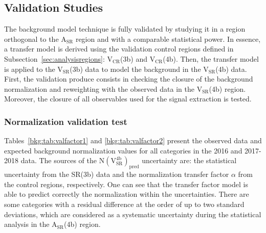 \subsection{Validation Studies} \label{sec:bkgvalidation}
The background model technique is fully validated by studying it in a region orthogonal to the $\mathrm{A_{SR}}$ region and with a comparable statistical power. In essence, a transfer model is derived using the validation control regions defined in Subsection~\ref{sec:analysisregions}: $\mathrm{V_{CR}}$(3b) and $\mathrm{V_{CR}}$(4b). Then, the transfer model is applied to the $\mathrm{V_{SR}}$(3b) data to model the background in the $\mathrm{V_{SR}}$(4b) data. First, the validation produce consists in checking the closure of the background normalization and reweighting with the observed data in the $\mathrm{V_{SR}}$(4b) region. Moreover, the closure of all observables used for the signal extraction is tested.

\subsubsection{Normalization validation test}

Tables~\ref{bkg:tab:valfactor1} and \ref{bkg:tab:valfactor2} present the observed data and expected background normalization values for all categories in the 2016 and 2017-2018 data. The sources of the $\mathrm{N(V_{SR}^{4b})_{pred}}$ uncertainty are: the statistical uncertainty from the SR(3b) data and the normalization transfer factor $\alpha$ from the control regions, respectively. One can see that the transfer factor model is able to predict correctly the normalization within the uncertainties. There are some categories with a residual difference at the order of up to two standard deviations, which are considered as a systematic uncertainty during the statistical analysis in the $\mathrm{A_{SR}}$(4b) region. 

